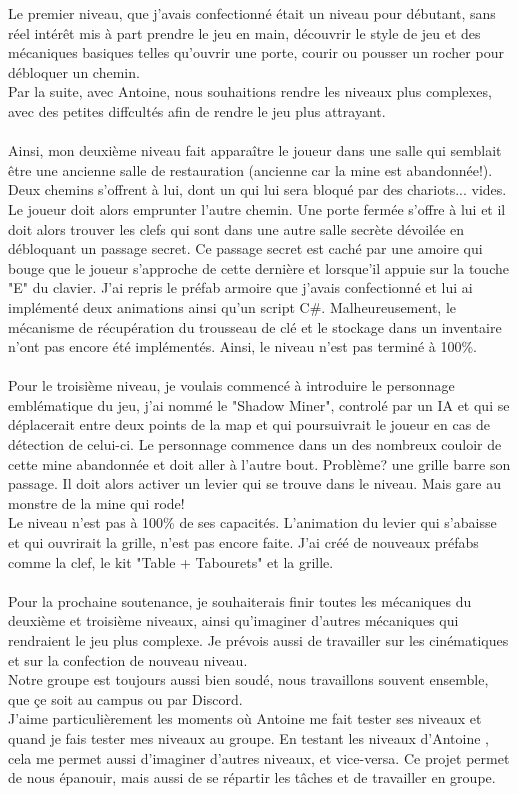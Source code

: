 \documentclass[titlepage, 13px, a4paper]{report}
\begin{document}
Le premier niveau, que j'avais confectionné était un niveau pour débutant, sans réel intérêt mis à part prendre le jeu en main,
découvrir le style de jeu et des mécaniques basiques telles qu'ouvrir une porte, courir ou pousser un rocher pour débloquer un chemin. \\
Par la suite, avec Antoine, nous souhaitions rendre les niveaux plus complexes, avec des petites diffcultés 
afin de rendre le jeu plus attrayant. \\ \\

Ainsi, mon deuxième niveau fait apparaître le joueur dans une salle qui semblait être une ancienne salle de restauration 
(ancienne car la mine est abandonnée!). Deux chemins s'offrent à lui, dont un qui lui sera bloqué par des chariots... vides. 
Le joueur doit alors emprunter l'autre chemin. Une porte fermée s'offre à lui et il doit alors trouver les clefs 
qui sont dans une autre salle secrète dévoilée en débloquant un passage secret. Ce passage secret est caché 
par une amoire qui bouge que le joueur s'approche de cette dernière et lorsque'il appuie sur la 
touche "E" du clavier. J'ai repris le préfab armoire que j'avais confectionné et lui ai implémenté deux animations ainsi qu'un script C\#. 
Malheureusement, le mécanisme de récupération du trousseau de clé et le stockage dans un inventaire n'ont pas encore été implémentés. 
Ainsi, le niveau n'est pas terminé à 100\%. \\ \\

Pour le troisième niveau, je voulais commencé à introduire le personnage emblématique du jeu, j'ai nommé le "Shadow Miner",
controlé par un IA et qui se déplacerait entre deux points de la map et qui poursuivrait le joueur en cas de détection de celui-ci. 
Le personnage commence dans un des nombreux couloir de cette mine abandonnée et doit aller à l'autre bout. 
Problème? une grille barre son passage. Il doit alors activer un levier qui se trouve dans le niveau. 
Mais gare au monstre de la mine qui rode! \\
Le niveau n'est pas à 100\% de ses capacités. L'animation du levier qui s'abaisse et qui ouvrirait la grille, n'est pas encore faite. 
J'ai créé de nouveaux préfabs comme la clef, le kit "Table + Tabourets" et la grille. \\ \\

Pour la prochaine soutenance, 
je souhaiterais finir toutes les mécaniques du deuxième et troisième niveaux, ainsi qu'imaginer d'autres mécaniques qui rendraient
le jeu plus complexe. Je prévois aussi de travailler sur les cinématiques et sur la confection de nouveau niveau. \\
Notre groupe est toujours aussi bien soudé, nous travaillons souvent ensemble, que çe soit au campus ou par Discord. \\
J'aime particulièrement les moments où Antoine me fait tester ses niveaux et quand je fais tester mes niveaux au groupe. 
En testant les niveaux d'Antoine , cela me permet aussi d'imaginer d'autres niveaux, et vice-versa. 
Ce projet permet de nous épanouir, mais aussi de se répartir les tâches et de travailler en groupe.
\end{document}
